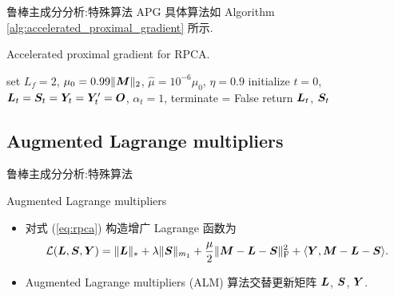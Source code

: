 \documentclass{beamer}
\begin{document}
\begin{frame}{鲁棒主成分分析:特殊算法}
  APG 具体算法如 Algorithm \ref{alg:accelerated_proximal_gradient} 所示.

  \begin{algorithm}[H]
    \small
    \label{alg:accelerated_proximal_gradient}
    \caption{Accelerated proximal gradient for RPCA.}
    set $L_f=2$, $\mu_0=0.99\|\bm{M}\|_2$, $\hat{\mu}=10^{-6}\mu_0$, $\eta=0.9$\;
    initialize $t=0$, $\bm{L}_t=\bm{S}_t=\bm{Y}_t=\bm{Y}'_t=\bm{O}$, $\alpha_t=1$, terminate = False\;
    return $\bm{L}_t$, $\bm{S}_t$\;
  \end{algorithm}
\end{frame}

\subsection{Augmented Lagrange multipliers}

\begin{frame}{鲁棒主成分分析:特殊算法}
  \begin{block}{Augmented Lagrange multipliers}
    \begin{itemize}
      \item 对式 (\ref{eq:rpca}) 构造增广 Lagrange 函数为
      \begin{equation}
        \mathcal{L}(\bm{L},\bm{S},\bm{Y})=\|\bm{L}\|_{*}+\lambda\|\bm{S}\|_{m_1}+\frac{\mu}{2}\|\bm{M}-\bm{L}-\bm{S}\|_{\text{F}}^2+\langle\bm{Y},\bm{M}-\bm{L}-\bm{S}\rangle.
      \end{equation}
      \item Augmented Lagrange multipliers (ALM) \cite{yuan2009sparse,lin2010augmented,candes2011robust} 算法交替更新矩阵 $\bm{L}$, $\bm{S}$, $\bm{Y}$.
    \end{itemize}
  \end{block}
\end{frame}
\end{document}

